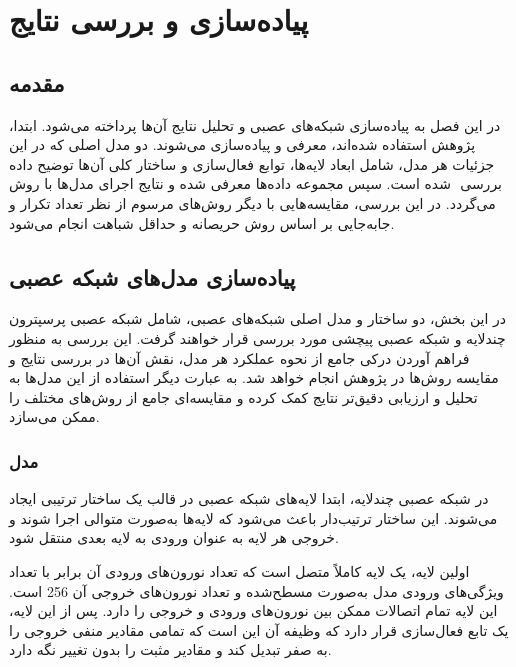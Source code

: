 \chapter{پیاده‌سازی و بررسی نتایج}

\section{مقدمه}
در این فصل به پیاده‌سازی شبکه‌های عصبی و تحلیل نتایج آن‌ها پرداخته می‌شود. ابتدا، دو مدل اصلی که در این ‎پژوهش استفاده شده‌اند، معرفی و پیاده‌سازی می‌شوند. جزئیات هر مدل، شامل ابعاد لایه‌ها، توابع فعال‌سازی و ساختار کلی آن‌ها توضیح داده شده است. 
سپس مجموعه داده‌ها معرفی شده و نتایج اجرای مدل‌ها با روش ‎‎ بررسی می‌گردد. در این بررسی، مقایسه‌هایی با دیگر روش‌های مرسوم از نظر تعداد تکرار و جابه‌جایی بر اساس روش حریصانه و حداقل شباهت انجام می‌شود.



\section{پیاده‌سازی مدل‌های شبکه عصبی}
در این بخش، دو ساختار و مدل اصلی شبکه‌های عصبی، شامل شبکه عصبی پرسپترون چندلایه%
و شبکه عصبی پیچشی%
مورد بررسی قرار خواهند گرفت.
این بررسی به منظور فراهم آوردن درکی جامع از نحوه عملکرد هر مدل، نقش آن‌ها در بررسی نتایج و مقایسه روش‌ها در پژوهش انجام خواهد شد. به عبارت دیگر استفاده از این مدل‌ها به تحلیل و ارزیابی دقیق‌تر نتایج کمک کرده و مقایسه‌ای جامع از روش‌های مختلف را ممکن می‌سازد.

\subsection{
	مدل
}
در شبکه عصبی چندلایه، ابتدا لایه‌های شبکه عصبی در قالب یک ساختار ترتیبی%
ایجاد می‌شوند. این ساختار ترتیب‌دار باعث می‌شود که لایه‌ها به‌صورت متوالی اجرا شوند و خروجی هر لایه به عنوان ورودی به لایه بعدی منتقل شود.

اولین لایه، یک لایه کاملاً متصل است که تعداد نورون‌های ورودی آن برابر با تعداد ویژگی‌های ورودی مدل به‌صورت مسطح‌شده و تعداد نورون‌های خروجی آن 256 است. این لایه تمام اتصالات ممکن بین نورون‌های ورودی و خروجی را دارد. پس از این لایه، یک تابع فعال‌سازی 
قرار دارد که وظیفه آن این است که تمامی مقادیر منفی خروجی را به صفر تبدیل کند و مقادیر مثبت را بدون تغییر نگه دارد.

